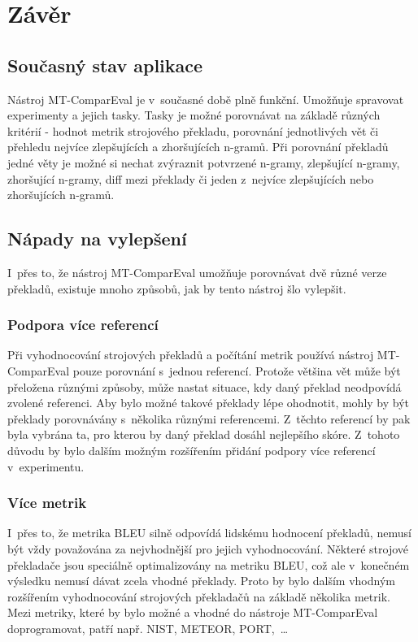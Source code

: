 \chapter{Závěr}

\section{Současný stav aplikace}
Nástroj \mbox{MT-ComparEval} je v~současné době plně funkční.
Umožňuje spravovat experimenty a jejich tasky.
Tasky je možné porovnávat na základě různých kritérií -
  hodnot metrik strojového překladu,
  porovnání jednotlivých vět
  či přehledu nejvíce zlepšujících a zhoršujících \mbox{n-gramů}.
Při porovnání překladů jedné věty je možné si nechat zvýraznit
  potvrzené \mbox{n-gramy}, zlepšující \mbox{n-gramy}, zhoršující \mbox{n-gramy}, diff mezi překlady
  či jeden z~nejvíce zlepšujících nebo zhoršujících \mbox{n-gramů}.


\section{Nápady na vylepšení}
I~přes to, že nástroj \mbox{MT-ComparEval} umožňuje porovnávat dvě různé verze překladů,
  existuje mnoho způsobů,
  jak by tento nástroj šlo vylepšit.

\subsection{Podpora více referencí}
Při vyhodnocování strojových překladů a počítání metrik používá nástroj \mbox{MT-ComparEval} pouze porovnání s~jednou referencí.
Protože většina vět může být přeložena různými způsoby,
  může nastat situace,
  kdy daný překlad neodpovídá zvolené referenci.
Aby bylo možné takové překlady lépe ohodnotit,
  mohly by být překlady porovnávány s~několika různými referencemi.
Z~těchto referencí by pak byla vybrána ta,
  pro kterou by daný překlad dosáhl nejlepšího skóre.
Z~tohoto důvodu by bylo dalším možným rozšířením přidání podpory více referencí v~experimentu.

\subsection{Více metrik}
I~přes to, že metrika BLEU silně odpovídá lidskému hodnocení překladů,
  nemusí být vždy považována za nejvhodnější pro jejich vyhodnocování.
Některé strojové překladače jsou speciálně optimalizovány na metriku BLEU,
  což ale v~konečném výsledku nemusí dávat zcela vhodné překlady.
Proto by bylo dalším vhodným rozšířením vyhodnocování strojových překladačů na základě několika metrik.
Mezi metriky,
  které by bylo možné a vhodné do nástroje \mbox{MT-ComparEval} doprogramovat,
  patří např. NIST, METEOR, PORT,~\dots

